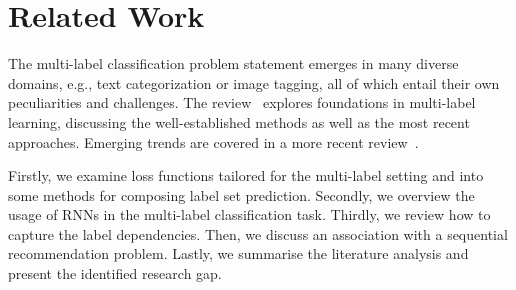 \documentclass[runningheads]{llncs}
\begin{document}

\section{Related Work}
\label{sec:related}

The multi-label classification problem statement emerges in many diverse domains, e.g., text categorization or image tagging, all of which entail their own peculiarities and challenges. The review~\cite{zhang2013review} explores foundations in multi-label learning, discussing the well-established methods as well as the most recent approaches.
Emerging trends are covered in a more recent review~\cite{liu2021emerging}.


Firstly, we examine loss functions tailored for the multi-label setting and into some methods for composing label set prediction. 
Secondly, we overview the usage of RNNs in the multi-label classification task. Thirdly, we review how to capture the label dependencies.
Then, we discuss an association with a sequential recommendation problem.
Lastly, we summarise the literature analysis and present the identified research gap. 
\end{document}
